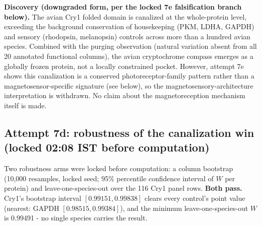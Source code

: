 \documentclass[12pt,a4paper]{article}
\begin{document}
\textbf{Discovery (downgraded form, per the locked 7e falsification branch below).} The avian Cry1 folded domain is canalized at the whole-protein level, exceeding the background conservation of housekeeping (PKM, LDHA, GAPDH) and sensory (rhodopsin, melanopsin) controls across more than a hundred avian species. Combined with the purging observation (natural variation absent from all 20 annotated functional columns), the avian cryptochrome compass emerges as a globally frozen protein, not a locally constrained pocket. However, attempt 7e shows this canalization is a conserved photoreceptor-family pattern rather than a magnetosensor-specific signature (see below), so the magnetosensory-architecture interpretation is withdrawn. No claim about the magnetoreception mechanism itself is made.

\subsection{Attempt 7d: robustness of the canalization win (locked 02:08 IST before computation)}
Two robustness arms were locked before computation: a column bootstrap (10{,}000 resamples, locked seed; 95\% percentile confidence interval of $W$ per protein) and leave-one-species-out over the 116 Cry1 panel rows. \textbf{Both pass.} Cry1's bootstrap interval $[0.99151, 0.99838]$ clears every control's point value (nearest: GAPDH $[0.98515, 0.99384]$), and the minimum leave-one-species-out $W$ is 0.99491 - no single species carries the result.
\end{document}
